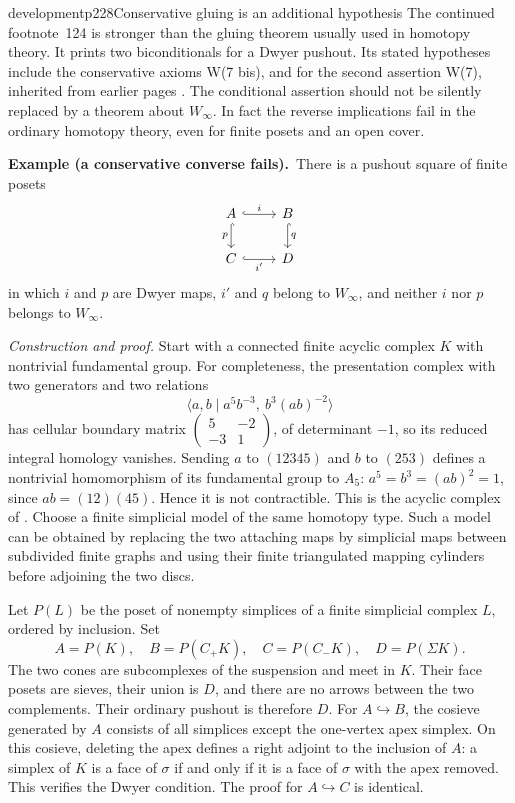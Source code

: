 \begin{dcomment}{development}{p228}{Conservative gluing is an additional hypothesis}
The continued footnote~124 is stronger than the gluing theorem usually used in homotopy theory. It prints two biconditionals for a Dwyer pushout. Its stated hypotheses include the conservative axioms W(7 bis), and for the second assertion W(7), inherited from earlier pages \citep[Chapter XII, manuscript pp.~76--78]{Grothendieck1990XII}. The conditional assertion should not be silently replaced by a theorem about $W_\infty$. In fact the reverse implications fail in the ordinary homotopy theory, even for finite posets and an open cover.

\textbf{Example (a conservative converse fails).}\ours\
There is a pushout square of finite posets
\[
\begin{tikzcd}
 A \arrow[r,hook,"i"] \arrow[d,hook,"p"'] & B \arrow[d,hook,"q"]\\
 C \arrow[r,hook,"i'"'] & D
\end{tikzcd}
\]
in which $i$ and $p$ are Dwyer maps, $i'$ and $q$ belong to $W_\infty$, and neither $i$ nor $p$ belongs to $W_\infty$.

\textit{Construction and proof.} Start with a connected finite acyclic complex $K$ with nontrivial fundamental group. For completeness, the presentation complex with two generators and two relations
\[
 \langle a,b\mid a^5b^{-3},\ b^3(ab)^{-2}\rangle
\]
has cellular boundary matrix $\left(\begin{smallmatrix}5&-2\\-3&1\end{smallmatrix}\right)$, of determinant $-1$, so its reduced integral homology vanishes. Sending $a$ to $(12345)$ and $b$ to $(253)$ defines a nontrivial homomorphism of its fundamental group to $A_5$: $a^5=b^3=(ab)^2=1$, since $ab=(12)(45)$. Hence it is not contractible. This is the acyclic complex of \citet[Example 2.38]{Hatcher2002}. Choose a finite simplicial model of the same homotopy type. Such a model can be obtained by replacing the two attaching maps by simplicial maps between subdivided finite graphs and using their finite triangulated mapping cylinders before adjoining the two discs.

Let $P(L)$ be the poset of nonempty simplices of a finite simplicial complex $L$, ordered by inclusion. Set
\[
 A=P(K),\quad B=P(C_+K),\quad C=P(C_-K),\quad D=P(\Sigma K).
\]
The two cones are subcomplexes of the suspension and meet in $K$. Their face posets are sieves, their union is $D$, and there are no arrows between the two complements. Their ordinary pushout is therefore $D$. For $A\hookrightarrow B$, the cosieve generated by $A$ consists of all simplices except the one-vertex apex simplex. On this cosieve, deleting the apex defines a right adjoint to the inclusion of $A$: a simplex of $K$ is a face of $\sigma$ if and only if it is a face of $\sigma$ with the apex removed. This verifies the Dwyer condition. The proof for $A\hookrightarrow C$ is identical.


\end{dcomment}

